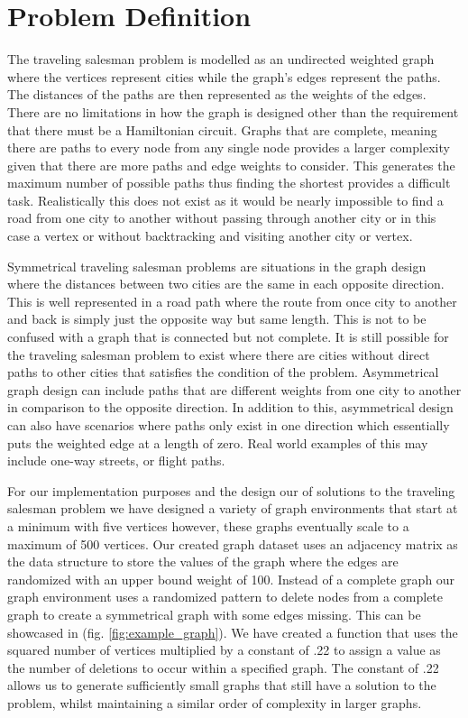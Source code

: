\documentclass[sigplan,screen]{acmart}
\begin{document}
\section{Problem Definition}
The traveling salesman problem is modelled as an undirected weighted graph where
the vertices represent cities while the graph’s edges represent the paths. The
distances of the paths are then represented as the weights of the edges. There
are no limitations in how the graph is designed other than the requirement that
there must be a Hamiltonian circuit. Graphs that are complete, meaning there are
paths to every node from any single node provides a larger complexity given that
there are more paths and edge weights to consider. This generates the maximum
number of possible paths thus finding the shortest provides a difficult task.
Realistically this does not exist as it would be nearly impossible to find a
road from one city to another without passing through another city or in this
case a vertex or without backtracking and visiting another city or vertex.

Symmetrical traveling salesman problems are situations in the graph design where
the distances between two cities are the same in each opposite direction. This
is well represented in a road path where the route from once city to another and
back is simply just the opposite way but same length. This is not to be confused
with a graph that is connected but not complete. It is still possible for the
traveling salesman problem to exist where there are cities without direct paths
to other cities that satisfies the condition of the problem. Asymmetrical graph
design can include paths that are different weights from one city to another in
comparison to the opposite direction. In addition to this, asymmetrical design
can also have scenarios where paths only exist in one direction which
essentially puts the weighted edge at a length of zero. Real world examples of
this may include one-way streets, or flight paths.

For our implementation purposes and the design our of solutions to the traveling
salesman problem we have designed a variety of graph environments that start at
a minimum with five vertices however, these graphs eventually scale to a maximum
of 500 vertices. Our created graph dataset uses an adjacency matrix as the data
structure to store the values of the graph where the edges are randomized with
an upper bound weight of 100. Instead of a complete graph our graph environment
uses a randomized pattern to delete nodes from a complete graph to create a
symmetrical graph with some edges missing. This can be showcased in (fig.
\ref{fig:example_graph}). We have created a function that uses the squared
number of vertices multiplied by a constant of .22 to assign a value as the
number of deletions to occur within a specified graph. The constant of .22
allows us to generate sufficiently small graphs that still have a solution to
the problem, whilst maintaining a similar order of complexity in larger graphs.
\end{document}
